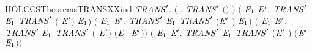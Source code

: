 \begin{SaveVerbatim}{HOLCCSTheoremsTRANSXXind}
\HOLTokenTurnstile{} \HOLSymConst{\HOLTokenForall{}}\ensuremath{\HOLBoundVar{TRANS}\sp{\prime}}.
       \ensuremath{(}\HOLSymConst{\HOLTokenForall{}} . \ensuremath{\HOLBoundVar{TRANS}\sp{\prime}} \ensuremath{(}\HOLSymConst{\ensuremath{\ldotp}}\ensuremath{)}  \ensuremath{)} \HOLSymConst{\HOLTokenConj{}}
       \ensuremath{(}\HOLSymConst{\HOLTokenForall{}}  \ensuremath{\HOLBoundVar{E}\sb{\mathrm{1}}} \ensuremath{\HOLBoundVar{E}\sp{\prime}}. \ensuremath{\HOLBoundVar{TRANS}\sp{\prime}}   \ensuremath{\HOLBoundVar{E}\sb{\mathrm{1}}} \HOLSymConst{\HOLTokenImp{}} \ensuremath{\HOLBoundVar{TRANS}\sp{\prime}} \ensuremath{(} \HOLSymConst{\ensuremath{+}} \ensuremath{\HOLBoundVar{E}\sp{\prime}}\ensuremath{)}  \ensuremath{\HOLBoundVar{E}\sb{\mathrm{1}}}\ensuremath{)} \HOLSymConst{\HOLTokenConj{}}
       \ensuremath{(}\HOLSymConst{\HOLTokenForall{}}  \ensuremath{\HOLBoundVar{E}\sb{\mathrm{1}}} \ensuremath{\HOLBoundVar{E}\sp{\prime}}. \ensuremath{\HOLBoundVar{TRANS}\sp{\prime}}   \ensuremath{\HOLBoundVar{E}\sb{\mathrm{1}}} \HOLSymConst{\HOLTokenImp{}} \ensuremath{\HOLBoundVar{TRANS}\sp{\prime}} \ensuremath{(}\ensuremath{\HOLBoundVar{E}\sp{\prime}} \HOLSymConst{\ensuremath{+}} \ensuremath{)}  \ensuremath{\HOLBoundVar{E}\sb{\mathrm{1}}}\ensuremath{)} \HOLSymConst{\HOLTokenConj{}}
       \ensuremath{(}\HOLSymConst{\HOLTokenForall{}}  \ensuremath{\HOLBoundVar{E}\sb{\mathrm{1}}} \ensuremath{\HOLBoundVar{E}\sp{\prime}}. \ensuremath{\HOLBoundVar{TRANS}\sp{\prime}}   \ensuremath{\HOLBoundVar{E}\sb{\mathrm{1}}} \HOLSymConst{\HOLTokenImp{}} \ensuremath{\HOLBoundVar{TRANS}\sp{\prime}} \ensuremath{(} \HOLSymConst{\ensuremath{\mid}} \ensuremath{\HOLBoundVar{E}\sp{\prime}}\ensuremath{)}  \ensuremath{(}\ensuremath{\HOLBoundVar{E}\sb{\mathrm{1}}} \HOLSymConst{\ensuremath{\mid}} \ensuremath{\HOLBoundVar{E}\sp{\prime}}\ensuremath{)}\ensuremath{)} \HOLSymConst{\HOLTokenConj{}}
       \ensuremath{(}\HOLSymConst{\HOLTokenForall{}}  \ensuremath{\HOLBoundVar{E}\sb{\mathrm{1}}} \ensuremath{\HOLBoundVar{E}\sp{\prime}}. \ensuremath{\HOLBoundVar{TRANS}\sp{\prime}}   \ensuremath{\HOLBoundVar{E}\sb{\mathrm{1}}} \HOLSymConst{\HOLTokenImp{}} \ensuremath{\HOLBoundVar{TRANS}\sp{\prime}} \ensuremath{(}\ensuremath{\HOLBoundVar{E}\sp{\prime}} \HOLSymConst{\ensuremath{\mid}} \ensuremath{)}  \ensuremath{(}\ensuremath{\HOLBoundVar{E}\sp{\prime}} \HOLSymConst{\ensuremath{\mid}} \ensuremath{\HOLBoundVar{E}\sb{\mathrm{1}}}\ensuremath{)}\ensuremath{)} \HOLSymConst{\HOLTokenConj{}}

\end{SaveVerbatim}
